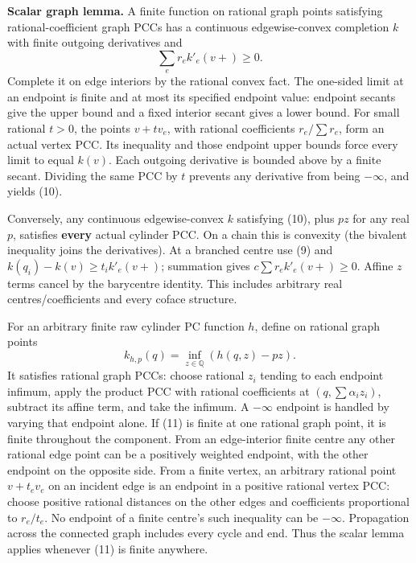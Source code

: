 \documentclass[
  11pt,
]{article}
\begin{document}
\textbf{Scalar graph lemma.} A finite function on rational graph points
satisfying rational-coefficient graph PCCs has a continuous
edgewise-convex completion \(k\) with finite outgoing derivatives and \[
                              \sum_e r_e k'_e(v+)\geq0.        \tag{10}
\] Complete it on edge interiors by the rational convex fact. The
one-sided limit at an endpoint is finite and at most its specified
endpoint value: endpoint secants give the upper bound and a fixed
interior secant gives a lower bound. For small rational \(t>0\), the
points \(v+t v_e\), with rational coefficients \(r_e/\sum r_e\), form an
actual vertex PCC. Its inequality and those endpoint upper bounds force
every limit to equal \(k(v)\). Each outgoing derivative is bounded above
by a finite secant. Dividing the same PCC by \(t\) prevents any
derivative from being \(-\infty\), and yields (10).

Conversely, any continuous edgewise-convex \(k\) satisfying (10), plus
\(pz\) for any real \(p\), satisfies \textbf{every} actual cylinder PCC.
On a chain this is convexity (the bivalent inequality joins the
derivatives). At a branched centre use (9) and
\(k(q_i)-k(v)\geq t_i k'_e(v+)\); summation gives
\(c\sum r_e k'_e(v+)\geq0\). Affine \(z\) terms cancel by the barycentre
identity. This includes arbitrary real centres/coefficients and every
coface structure.

For an arbitrary finite raw cylinder PC function \(h\), define on
rational graph points \[
 k_{h,p}(q)=\inf_{z\in\mathbb{Q}}(h(q,z)-pz).                 \tag{11}
\] It satisfies rational graph PCCs: choose rational \(z_i\) tending to
each endpoint infimum, apply the product PCC with rational coefficients
at \((q,\sum\alpha_i z_i)\), subtract its affine term, and take the
infimum. A \(-\infty\) endpoint is handled by varying that endpoint
alone. If (11) is finite at one rational graph point, it is finite
throughout the component. From an edge-interior finite centre any other
rational edge point can be a positively weighted endpoint, with the
other endpoint on the opposite side. From a finite vertex, an arbitrary
rational point \(v+t_ev_e\) on an incident edge is an endpoint in a
positive rational vertex PCC: choose positive rational distances on the
other edges and coefficients proportional to \(r_e/t_e\). No endpoint of
a finite centre's such inequality can be \(-\infty\). Propagation across
the connected graph includes every cycle and end. Thus the scalar lemma
applies whenever (11) is finite anywhere.
\end{document}
